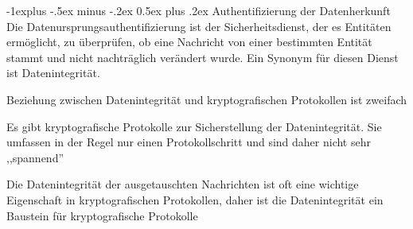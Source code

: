 \documentclass[a4paper]{article}
\makeatletter
\renewcommand{\subsection}{\@startsection{subsection}{2}{0mm}%
 {-1explus -.5ex minus -.2ex}%
 {0.5ex plus .2ex}%
 {\normalfont\normalsize\bfseries}}
\makeatother
\begin{document}
\begin{multicols}{3}
      \subsection{Authentifizierung der Datenherkunft}
      Die Datenursprungsauthentifizierung ist der Sicherheitsdienst, der es Entitäten ermöglicht, zu überprüfen, ob eine Nachricht von einer bestimmten Entität stammt und nicht nachträglich verändert wurde. Ein Synonym für diesen Dienst ist Datenintegrität.
      \begin{itemize*}
            \item Beziehung zwischen Datenintegrität und kryptografischen Protokollen ist zweifach
            \item Es gibt kryptografische Protokolle zur Sicherstellung der Datenintegrität. Sie umfassen in der Regel nur einen Protokollschritt und sind daher nicht sehr ,,spannend''
            \item Die Datenintegrität der ausgetauschten Nachrichten ist oft eine wichtige Eigenschaft in kryptografischen Protokollen, daher ist die Datenintegrität ein Baustein für kryptografische Protokolle
      \end{itemize*}


\end{multicols}
\end{document}
